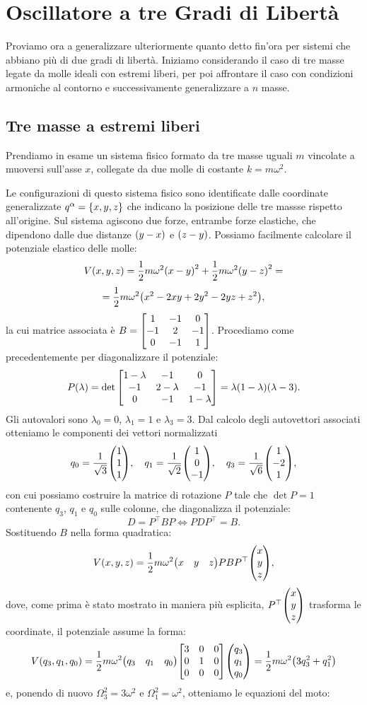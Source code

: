 \section{Oscillatore a tre Gradi di Libert\`a}
    Proviamo ora a generalizzare ulteriormente quanto detto fin'ora per sistemi che abbiano pi\`u di due gradi di libert\`a. Iniziamo considerando il caso di tre masse legate da molle ideali con estremi liberi, per poi affrontare il caso con condizioni armoniche al contorno e successivamente generalizzare a $n$ masse.
    \subsection{Tre masse a estremi liberi}
        Prendiamo in esame un sistema fisico formato da tre masse uguali $m$ vincolate a muoversi sull'asse $x$, collegate da due molle di costante $k=m\omega^2$. \par Le configurazioni di questo sistema fisico sono identificate dalle coordinate generalizzate $q^\alpha=\qty{x,y,z}$ che indicano la posizione delle tre massse rispetto all'origine. Sul sistema agiscono due forze, entrambe forze elastiche, che dipendono dalle due distanze $\qty(y-x)$ e $\qty(z-y)$. Possiamo facilmente calcolare il potenziale elastico delle molle: $$V\qty(x,y,z)=\frac{1}{2}m\omega^2\qty(x-y)^2+\frac{1}{2}m\omega^2\qty(y-z)^2=$$ $$=\frac{1}{2}m\omega^2\qty(x^2-2xy+2y^2-2yz+z^2),$$ la cui matrice associata \`e $\displaystyle B=\mqty[1 & -1 & 0 \\ -1 & 2 & -1 \\ 0 & -1 & 1]$. Procediamo come precedentemente per diagonalizzare il potenziale: $$P\qty(\lambda)=\det\mqty[1-\lambda & -1 & 0 \\ -1 & 2-\lambda & -1 \\ 0 & -1 & 1-\lambda]=\lambda\qty(1-\lambda)\qty(\lambda-3).$$ Gli autovalori sono $\lambda_0=0$, $\lambda_1=1$ e $\lambda_3=3$. Dal calcolo degli autovettori associati otteniamo le componenti dei vettori normalizzati $$q_0=\frac{1}{\sqrt{3}}\mqty(1 \\ 1 \\ 1),\quad q_1=\frac{1}{\sqrt{2}}\mqty(1 \\ 0 \\ -1),\quad q_3=\frac{1}{\sqrt{6}}\mqty(1 \\ -2 \\ 1),$$ con cui possiamo costruire la matrice di rotazione $P$ tale che $\det P=1$ contenente $q_3$, $q_1$ e $q_0$ sulle colonne, che diagonalizza il potenziale: $$D=P^\top BP \iff PDP^\top=B.$$ Sostituendo $B$ nella forma quadratica: $$V\qty(x,y,z)=\frac{1}{2}m\omega^2\mqty(x & y & z)PBP^\top\mqty(x\\y\\z),$$ dove, come prima \`e stato mostrato in maniera pi\`u esplicita, $P^\top\mqty(x\\y\\z)$ trasforma le coordinate, il potenziale assume la forma: $$V(q_3,q_1,q_0)=\frac{1}{2}m\omega^2\mqty(q_3 & q_1 & q_0)\mqty[\dmat[0]{3,1,0}]\mqty(q_3 \\ q_1 \\ q_0)=\frac{1}{2}m\omega^2\qty(3q_3^2+q_1^2)$$ e, ponendo di nuovo $\Omega_3^2=3\omega^2$ e $\Omega_1^2=\omega^2$, otteniamo le equazioni del moto:
